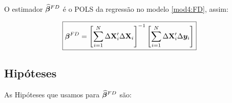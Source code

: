 \documentclass[11pt, oneside, a4paper, article]{article}
\numberwithin{equation}{section}
\begin{document}
O estimador $\widehat{\boldsymbol{\beta}}^{FD}$ é o POLS da regressão no modelo \eqref{mod4:FD}, assim:

\vspace{-1 em}
\begin{align} \label{beta:pols:FD}
\Aboxed{
\betavec^{FD} =
\left[ \sum_{i=1}^{N} \Delta \Xmat_{i}' \Delta \Xmat_{i} \right]^{-1}
\left[ \sum_{i=1}^{N} \Delta \Xmat_{i}' \Delta \yvec_{i} \right]
}
\end{align}

\subsection{Hipóteses}

As Hipóteses que usamos para $\widehat{\boldsymbol{\beta}}^{FD}$ são:
\end{document}
